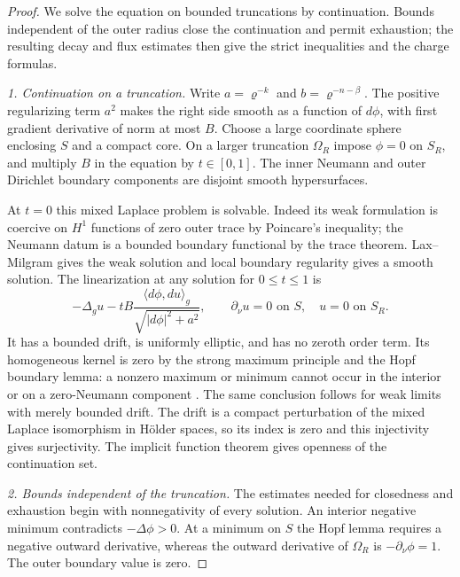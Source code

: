 \begin{proof}
We solve the equation on bounded truncations by continuation.  Bounds
independent of the outer radius close the continuation and permit
exhaustion; the resulting decay and flux estimates then give the strict
inequalities and the charge formulas.

\emph{1. Continuation on a truncation.} Write $a=\varrho^{-k}$ and
$b=\varrho^{-n-\beta}$.  The
positive regularizing term $a^2$ makes the right side smooth
as a function of $d\phi$, with first gradient derivative of
norm at most $B$.  Choose a large coordinate sphere enclosing
$S$ and a compact core.  On a larger truncation $\Omega_R$
impose $\phi=0$ on $S_R$, and multiply $B$ in the equation by
$t\in[0,1]$.  The inner Neumann and outer Dirichlet boundary
components are disjoint smooth hypersurfaces.

At $t=0$ this mixed Laplace problem is solvable.  Indeed its
weak formulation is coercive on $H^1$ functions of zero outer
trace by Poincare's inequality; the Neumann datum is a bounded
boundary functional by the trace theorem.  Lax--Milgram gives
the weak solution and local boundary regularity gives a smooth
solution.  The linearization at any solution for $0\le t\le1$
is
\[
 -\Delta_g u-tB\frac{\langle d\phi,du\rangle_g}
                     {\sqrt{|d\phi|^2+a^2}},
 \qquad \partial_\nu u=0\text{ on }S,\quad u=0\text{ on }S_R.
\]
It has a bounded drift, is uniformly elliptic, and has no
zeroth order term.  Its homogeneous kernel is zero by the
strong maximum principle and the Hopf boundary lemma: a
nonzero maximum or minimum cannot occur in the interior or
on a zero-Neumann component \cite[Chapter~3]{GilbargTrudinger}.
The same conclusion follows
for weak limits with merely bounded drift.  The drift is a
compact perturbation of the mixed Laplace isomorphism in
Hölder spaces, so its index is zero and this injectivity gives
surjectivity.  The implicit function theorem gives openness
of the continuation set.

\medskip\noindent\emph{2. Bounds independent of the truncation.}
The estimates needed for closedness and exhaustion begin with
nonnegativity of every solution.  An interior negative minimum
contradicts $-\Delta\phi>0$.  At a minimum on $S$ the Hopf
lemma requires a negative outward derivative, whereas the
outward derivative of $\Omega_R$ is $-\partial_\nu\phi=1$.
The outer boundary value is zero.


\end{proof}
